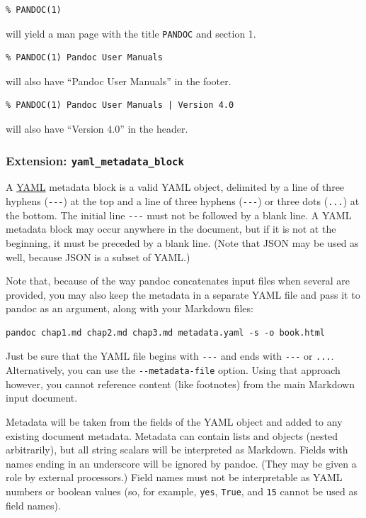 \documentclass[
]{article}
\begin{document}
\begin{verbatim}
% PANDOC(1)
\end{verbatim}

will yield a man page with the title \texttt{PANDOC} and section 1.

\begin{verbatim}
% PANDOC(1) Pandoc User Manuals
\end{verbatim}

will also have ``Pandoc User Manuals'' in the footer.

\begin{verbatim}
% PANDOC(1) Pandoc User Manuals | Version 4.0
\end{verbatim}

will also have ``Version 4.0'' in the header.

\hypertarget{extension-yaml_metadata_block}{%
\subsubsection{\texorpdfstring{Extension:
\texttt{yaml\_metadata\_block}}{Extension: yaml\_metadata\_block}}\label{extension-yaml_metadata_block}}

A \href{https://yaml.org/spec/1.2/spec.html}{YAML} metadata block is a
valid YAML object, delimited by a line of three hyphens
(\texttt{-\/-\/-}) at the top and a line of three hyphens
(\texttt{-\/-\/-}) or three dots (\texttt{...}) at the bottom. The
initial line \texttt{-\/-\/-} must not be followed by a blank line. A
YAML metadata block may occur anywhere in the document, but if it is not
at the beginning, it must be preceded by a blank line. (Note that JSON
may be used as well, because JSON is a subset of YAML.)

Note that, because of the way pandoc concatenates input files when
several are provided, you may also keep the metadata in a separate YAML
file and pass it to pandoc as an argument, along with your Markdown
files:

\begin{verbatim}
pandoc chap1.md chap2.md chap3.md metadata.yaml -s -o book.html
\end{verbatim}

Just be sure that the YAML file begins with \texttt{-\/-\/-} and ends
with \texttt{-\/-\/-} or \texttt{...}. Alternatively, you can use the
\texttt{-\/-metadata-file} option. Using that approach however, you
cannot reference content (like footnotes) from the main Markdown input
document.

Metadata will be taken from the fields of the YAML object and added to
any existing document metadata. Metadata can contain lists and objects
(nested arbitrarily), but all string scalars will be interpreted as
Markdown. Fields with names ending in an underscore will be ignored by
pandoc. (They may be given a role by external processors.) Field names
must not be interpretable as YAML numbers or boolean values (so, for
example, \texttt{yes}, \texttt{True}, and \texttt{15} cannot be used as
field names).
\end{document}
